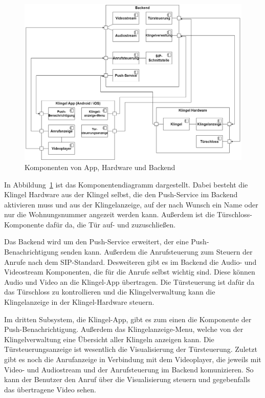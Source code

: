 \begin{figure}[ht!]
    \centering\includegraphics[width=\paperwidth-2in]{../assets/img/Komponentendiagramm}

    \caption{Komponenten von App, Hardware und Backend}
    \label{fig:komponentendiagramm}
\end{figure}
In Abbildung~\ref{fig:komponentendiagramm} ist das Komponentendiagramm dargestellt.
Dabei besteht die Klingel Hardware aus der Klingel selbst, die den Push-Service im Backend aktivieren muss 
und aus der Klingelanzeige, auf der nach Wunsch ein Name oder nur die Wohnungsnummer angezeit werden kann.
Außerdem ist die Türschloss-Komponente dafür da, die Tür auf- und zuzuschließen.

Das Backend wird um den Push-Service erweitert, der eine Push-Benachrichtigung senden kann.
Außerdem die Anrufsteuerung zum Steuern der Anrufe nach dem SIP-Standard.
Desweiteren gibt es im Backend die Audio- und Videostream Komponenten, die für die Anrufe selbst wichtig sind.
Diese können Audio und Video an die Klingel-App übertragen.
Die Türsteuerung ist dafür da das Türschloss zu kontrollieren und die Klingelverwaltung kann die Klingelanzeige in der Klingel-Hardware steuern.

Im dritten Subsystem, die Klingel-App, gibt es zum einen die Komponente der Push-Benachrichtigung.
Außerdem das Klingelanzeige-Menu, welche von der Klingelverwaltung eine Übersicht aller Klingeln anzeigen kann.
Die Türsteuerungsanzeige ist wesentlich die Visualisierung der Türsteuerung.
Zuletzt gibt es noch die Anrufanzeige in Verbindung mit dem Videoplayer, die jeweils mit Video- und Audiostream und der Anrufsteuerung im Backend komunizieren.
So kann der Benutzer den Anruf über die Visualisierung steuern und gegebenfalls das übertragene Video sehen.


